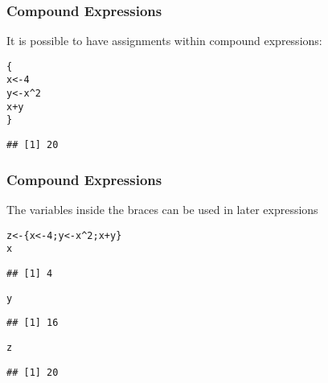 \documentclass[12pt]{beamer}\usepackage[]{graphicx}\usepackage[]{color}
\makeatletter
\newcommand{\hlnum}[1]{\textcolor[rgb]{0.686,0.059,0.569}{#1}}%
\newcommand{\hlopt}[1]{\textcolor[rgb]{0,0,0}{#1}}%
\newcommand{\hlstd}[1]{\textcolor[rgb]{0.345,0.345,0.345}{#1}}%
\newcommand{\hlkwb}[1]{\textcolor[rgb]{0.69,0.353,0.396}{#1}}%
\newenvironment{kframe}{%
 \def\at@end@of@kframe{}%
 \ifinner\ifhmode%
  \def\at@end@of@kframe{\end{minipage}}%
  \begin{minipage}{\columnwidth}%
 \fi\fi%
 \def\FrameCommand##1{\hskip\@totalleftmargin \hskip-\fboxsep
 \colorbox{shadecolor}{##1}\hskip-\fboxsep
     \hskip-\linewidth \hskip-\@totalleftmargin \hskip\columnwidth}%
 \MakeFramed {\advance\hsize-\width
   \@totalleftmargin\z@ \linewidth\hsize
   \@setminipage}}%
 {\par\unskip\endMakeFramed%
 \at@end@of@kframe}
\newenvironment{knitrout}{}{} %
\makeatother
\begin{document}
\begin{frame}[fragile]
\frametitle{Compound Expressions}

It is possible to have assignments within compound expressions:
\begin{knitrout}\footnotesize
{}\color{fgcolor}\begin{kframe}
\begin{alltt}
\hlstd{\{}
  \hlstd{x} \hlkwb{<-} \hlnum{4}
  \hlstd{y} \hlkwb{<-} \hlstd{x}\hlopt{^}\hlnum{2}
  \hlstd{x} \hlopt{+} \hlstd{y}
\hlstd{\}}
\end{alltt}
\begin{verbatim}
## [1] 20
\end{verbatim}
\end{kframe}
\end{knitrout}

\end{frame}


\begin{frame}[fragile]
\frametitle{Compound Expressions}

The variables inside the braces can be used in later expressions
\begin{knitrout}\footnotesize
{}\color{fgcolor}\begin{kframe}
\begin{alltt}
\hlstd{z} \hlkwb{<-} \hlstd{\{x} \hlkwb{<-} \hlnum{4}\hlstd{; y} \hlkwb{<-} \hlstd{x}\hlopt{^}\hlnum{2}\hlstd{; x} \hlopt{+} \hlstd{y\}}
\hlstd{x}
\end{alltt}
\begin{verbatim}
## [1] 4
\end{verbatim}
\begin{alltt}
\hlstd{y}
\end{alltt}
\begin{verbatim}
## [1] 16
\end{verbatim}
\begin{alltt}
\hlstd{z}
\end{alltt}
\begin{verbatim}
## [1] 20
\end{verbatim}
\end{kframe}
\end{knitrout}

\end{frame}

\end{document}
